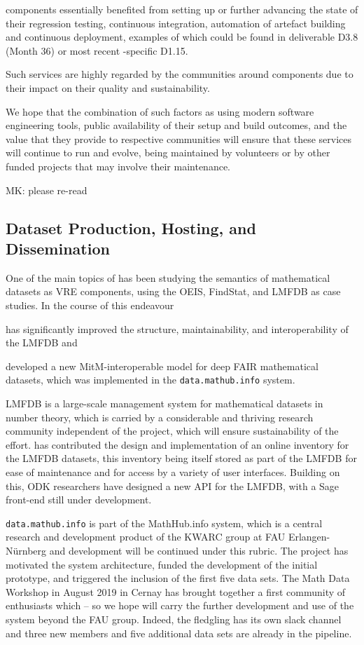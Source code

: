 \documentclass{deliverablereport}
\def\dmh{\texttt{data.mathub.info}\xspace}
\begin{document}
\ODK components essentially benefited from setting up or further
advancing the state of their regression testing, continuous 
integration, automation of artefact building and continuous 
deployment, examples of which could be found in deliverable 
D3.8 (Month 36) or most recent \GAP-specific D1.15.

Such services are highly regarded by the communities around
\ODK components due to their impact on their quality and 
sustainability.

We hope that the combination of such factors as using modern
software engineering tools, public availability of their
setup and build outcomes, and the value that they provide to
respective communities will ensure that these services will
continue to run and evolve, being maintained by volunteers
or by other funded projects that may involve their maintenance.

\begin{newpart}{MK: please re-read}
\subsection{Dataset Production, Hosting, and Dissemination}

One of the main topics of  has been studying the semantics of mathematical
datasets as VRE components, using the OEIS, FindStat, and LMFDB as case studies. In the
course of this endeavour \pn
\begin{compactenum}
\item has significantly improved the structure, maintainability, and interoperability of
  the LMFDB and
\item developed a new MitM-interoperable model for deep FAIR mathematical datasets, which
  was implemented in the \dmh system. 
\end{compactenum}
LMFDB is a large-scale management system for mathematical datasets in number theory, which
is carried by a considerable and thriving research community independent of the \pn
project, which will ensure sustainability of the effort.
\pn has contributed the design and implementation of an online inventory for the LMFDB datasets, 
this inventory being itself stored as part of the LMFDB for ease of maintenance and for access by a variety of user interfaces.
Building on this, ODK researchers have designed a new API for the LMFDB, with a Sage front-end still under development.




\dmh is part of the MathHub.info system, which is a central research and development
product of the KWARC group at FAU Erlangen-N\"urnberg and development will be continued
under this rubric.
The \pn project has motivated the system architecture, funded the development of the
initial prototype, and triggered the inclusion of the first five data sets.
The Math Data Workshop in August 2019 in Cernay has brought together a first community of
enthusiasts which -- so we hope will carry the further development and use of the system
beyond the FAU group.
Indeed, the fledgling has its own slack channel and three new members and five additional
data sets are already in the pipeline. 
\end{newpart}
\end{document}
